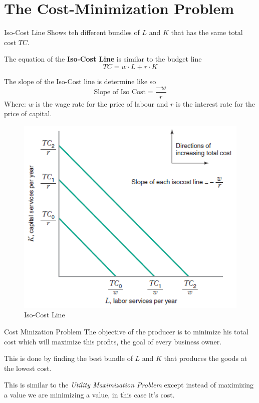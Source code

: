 \documentclass[../ECON-281-Notes.tex]{subfiles}
\begin{document}
\section{The Cost-Minimization Problem}
\begin{Definition}
    {Iso-Cost Line}
    Shows teh different bundles of \(L\) and \(K\) that has the same total cost \(TC\).

    The equation of the \textbf{Iso-Cost Line} is similar to the budget line
    \begin{equation}
        TC = w\cdot L + r\cdot K    
    \end{equation}

    The slope of the Iso-Cost line is determine like so
    \begin{equation}
        \text{Slope of Iso Cost} = \frac{-w}{r} 
    \end{equation}
    Where:
    \(w\) is the wage rate for the price of labour and \(r\) is the interest rate for the price of capital.

\end{Definition}

\begin{figure}[h]
    \centering
    \includegraphics[width=\columnwidth]{../assets/isocost-line.png}
    \caption{Iso-Cost Line}
    \label{fig:iso_cost_line}
\end{figure}


\begin{DndSidebar}[color=PhbLightGreen]{Cost Minization Problem}
    The objective of the producer is to minimize his total cost which will maximize this profits, the goal of every business owner. 

    This is done by finding the best bundle of \(L\) and \(K\) that produces the goods at the lowest cost.

    This is similar to the \emph{Utility Maximization Problem} except instead of maximizing a value we are minimizing a value, in this case it's cost.
\end{DndSidebar}
\end{document}
